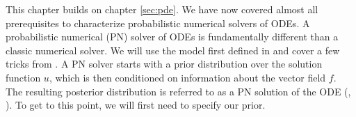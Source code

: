 \ifdefined\COMPILINGFROMMAIN
\else
    
    
\fi


This chapter builds on chapter \ref{sec:pde}. We have now covered almost all prerequisites to characterize probabilistic numerical solvers of ODEs. A probabilistic numerical (PN) solver of ODEs is fundamentally different than a classic numerical solver. We will use the model first defined in \cite{invention_of_ODE_solver} and cover a few tricks from \cite{nicoThesis}. A PN solver starts with a prior distribution over the solution function $u$, which is then conditioned on information about the vector field $f$. The resulting posterior distribution is referred to as a PN solution of the ODE (\cite{nicoThesis}, \cite{exponential_probabilistic}). To get to this point, we will first need to specify our prior.

